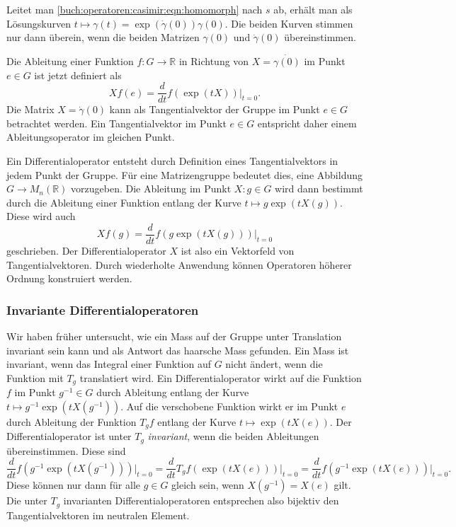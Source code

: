 Leitet man
\eqref{buch:operatoren:casimir:eqn:homomorph}
nach $s$ ab, erhält man als Lösungskurven
\(
t\mapsto \gamma(t) = \exp(\dot{\gamma}(0)) \gamma(0).
\)
Die beiden Kurven stimmen nur dann überein, wenn die beiden Matrizen
$\gamma(0)$ und $\dot{\gamma}(0)$ übereinstimmen.

Die Ableitung einer Funktion $f\colon G\to\mathbb{R}$ in Richtung von
$X=\dot{\gamma(0)}$ im Punkt $e\in G$ ist jetzt definiert als
\[
Xf(e)
=
\frac{d}{dt} f(\exp(tX)) \bigg|_{t=0}.
\]
Die Matrix $X=\dot{\gamma}(0)$ kann als Tangentialvektor der Gruppe
im Punkt $e\in G$ betrachtet werden.
Ein Tangentialvektor im Punkt $e\in G$ entspricht daher einem
Ableitungsoperator im gleichen Punkt.

Ein Differentialoperator entsteht durch Definition eines Tangentialvektors
in jedem Punkt der Gruppe.
Für eine Matrizengruppe bedeutet dies, eine Abbildung $G\to M_n(\mathbb{R})$ 
vorzugeben.
Die Ableitung im Punkt $X\colon g\in G$ wird dann bestimmt durch die
Ableitung einer Funktion entlang der Kurve $t\mapsto g\exp(tX(g))$.
Diese wird auch
\[
Xf(g)
=
\frac{d}{dt}f(g\exp(tX(g)))\bigg|_{t=0}
\]
geschrieben.
Der Differentialoperator $X$ ist also ein Vektorfeld von Tangentialvektoren.
Durch wiederholte Anwendung können Operatoren höherer Ordnung konstruiert
werden.

%
%
\subsubsection{Invariante Differentialoperatoren}
Wir haben früher untersucht, wie ein Mass auf der Gruppe unter Translation
invariant sein kann und als Antwort das haarsche Mass gefunden.
Ein Mass ist invariant, wenn das Integral einer Funktion auf $G$ nicht
ändert, wenn die Funktion mit $T_g$ translatiert wird.
Ein Differentialoperator wirkt auf die Funktion $f$ im Punkt $g^{-1}\in G$
durch Ableitung entlang der Kurve $t\mapsto g^{-1}\exp(tX(g^{-1}))$.
Auf die verschobene Funktion wirkt er im Punkt $e$ durch Ableitung
der Funktion $T_gf$ entlang der Kurve $t\mapsto \exp(tX(e))$.
Der Differentialoperator ist unter $T_g$ {\em invariant}, wenn die beiden
Ableitungen übereinstimmen.
Diese sind
\[
\frac{d}{dt} f(g^{-1}\exp(tX(g^{-1}))) \bigg|_{t=0}
=
\frac{d}{dt} T_gf(\exp(tX(e)))\bigg|_{t=0}
=
\frac{d}{dt} f(g^{-1}\exp(tX(e)))\bigg|_{t=0}.
\]
Diese können nur dann für alle $g\in G$ gleich sein, wenn
$X(g^{-1}) = X(e)$ gilt.
Die unter $T_g$ invarianten Differentialoperatoren entsprechen also
bijektiv den Tangentialvektoren im neutralen Element.

